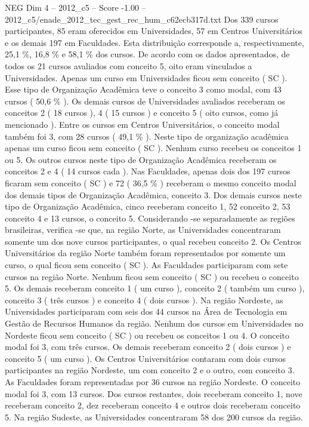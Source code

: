 \begin{textsample}{NEG Dim 4 – 2012\_c5 – Score -1.00 – 2012\_c5/enade\_2012\_tec\_gest\_rec\_hum\_c62ecb317d.txt}
Dos 339 cursos participantes, 85 eram oferecidos em Universidades, 57 em Centros Universitários e os demais 197 em Faculdades.
Esta distribuição corresponde a, respectivamente, 25,1 \%, 16,8 \% e 58,1 \% dos cursos.
De acordo com os dados apresentados, de todos os 21 cursos avaliados com conceito 5, oito eram vinculados a Universidades.
Apenas um curso em Universidades ficou sem conceito ( SC ).
Esse tipo de Organização Acadêmica teve o conceito 3 como modal, com 43 cursos ( 50,6 \% ).
Os demais cursos de Universidades avaliados receberam os conceitos 2 ( 18 cursos ), 4 ( 15 cursos ) e conceito 5 ( oito cursos, como já mencionado ).
Entre os cursos em Centros Universitários, o conceito modal também foi 3, com 28 cursos ( 49,1 \% ).
Neste tipo de organização acadêmica apenas um curso ficou sem conceito ( SC ).
Nenhum curso recebeu os conceitos 1 ou 5.
Os outros cursos neste tipo de Organização Acadêmica receberam os conceitos 2 e 4 ( 14 cursos cada ).
Nas Faculdades, apenas dois dos 197 cursos ficaram sem conceito ( SC ) e 72 ( 36,5 \% ) receberam o mesmo conceito modal dos demais tipos de Organização Acadêmica, conceito 3.
Dos demais cursos neste tipo de Organização Acadêmica, cinco receberam conceito 1, 52 conceito 2, 53 conceito 4 e 13 cursos, o conceito 5.
Considerando -se separadamente as regiões brasileiras, verifica -se que, na região Norte, as Universidades concentraram somente um dos nove cursos participantes, o qual recebeu conceito 2.
Os Centros Universitários da região Norte também foram representados por somente um curso, o qual ficou sem conceito ( SC ).
As Faculdades participaram com sete cursos na região Norte.
Nenhum ficou sem conceito ( SC ) ou recebeu o conceito 5.
Os demais receberam conceito 1 ( um curso ), conceito 2 ( também um curso ), conceito 3 ( três cursos ) e conceito 4 ( dois cursos ).
Na região Nordeste, as Universidades participaram com seis dos 44 cursos na Área de Tecnologia em Gestão de Recursos Humanos da região.
Nenhum dos cursos em Universidades no Nordeste ficou sem conceito ( SC ) ou recebeu os conceitos 1 ou 4.
O conceito modal foi 3, com três cursos.
Os demais receberam conceito 2 ( dois cursos ) e conceito 5 ( um curso ).
Os Centros Universitários contaram com dois cursos participantes na região Nordeste, um com conceito 2 e o outro, com conceito 3.
As Faculdades foram representadas por 36 cursos na região Nordeste.
O conceito modal foi 3, com 13 cursos.
Dos cursos restantes, dois receberam conceito 1, nove receberam conceito 2, dez receberam conceito 4 e outros dois receberam conceito 5.
Na região Sudeste, as Universidades concentraram 58 dos 200 cursos da região.

\end{textsample}
